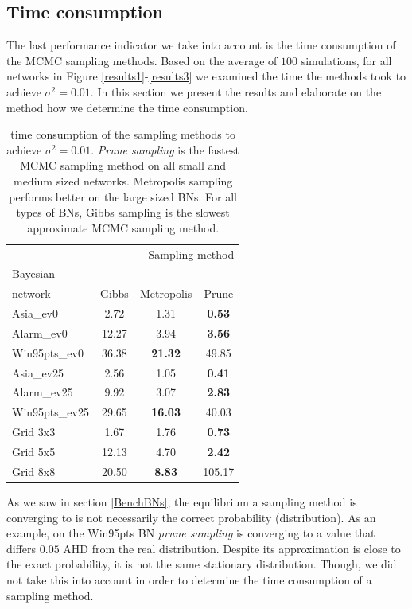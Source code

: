 \documentclass[a4paper, twoside, 11pt]{report}
\theoremstyle{plain}
\theoremstyle{definition}
\theoremstyle{remark}
\newcommand{\ps}{\textit{prune sampling }}
\newcommand{\Ps}{\textit{Prune sampling }}
\begin{document}
\subsection{Time consumption}\label{sec:time-cons}
The last performance indicator we take into account is the time consumption of the MCMC sampling methods. Based on the average of $100$ simulations, for all networks in Figure \ref{results1}-\ref{results3} we examined the time the methods took to achieve $\sigma^2 = 0.01$. In this section we present the results and elaborate on the method how we determine the time consumption.
\begin{center}
\begin{table}[b!]
\begin{center}
\begin{tabular}{l c c c}  
\toprule
\multicolumn{4}{r}{Sampling method} \\
\cmidrule(r){2-4}
Bayesian \\ network    & Gibbs    & Metropolis & Prune  \\
\midrule
Asia\_ev0 & 2.72 & 1.31 & \textbf{0.53}  \\
Alarm\_ev0 & 12.27 & 3.94 & \textbf{3.56}  \\
Win95pts\_ev0 & 36.38 & \textbf{21.32} & 49.85  \\
Asia\_ev25 & 2.56 & 1.05 & \textbf{0.41}  \\
Alarm\_ev25 & 9.92 & 3.07 & \textbf{2.83}  \\
Win95pts\_ev25 & 29.65 & \textbf{16.03} & 40.03  \\
Grid 3x3 & 1.67 & 1.76 & \textbf{0.73}  \\
Grid 5x5 & 12.13 & 4.70 & \textbf{2.42}  \\
Grid 8x8 & 20.50 & \textbf{8.83} & 105.17  \\
\bottomrule
\end{tabular}
\caption{time consumption of the sampling methods to achieve $\sigma^2 = 0.01$. \Ps is the fastest MCMC sampling method on all small and medium sized networks. Metropolis sampling performs better on the large sized BNs. For all types of BNs, Gibbs sampling is the slowest approximate MCMC sampling method.}
\label{time-table}
\end{center}
\end{table}
\end{center}
As we saw in section \ref{BenchBNs}, the equilibrium a sampling method is converging to is not necessarily the correct probability (distribution). As an example, on the Win95pts BN \ps is converging to a value that differs $0.05$ AHD from the real distribution. Despite its approximation is close to the exact probability, it is not the same stationary distribution. Though, we did not take this into account in order to determine the time consumption of a sampling method. \\
\end{document}
